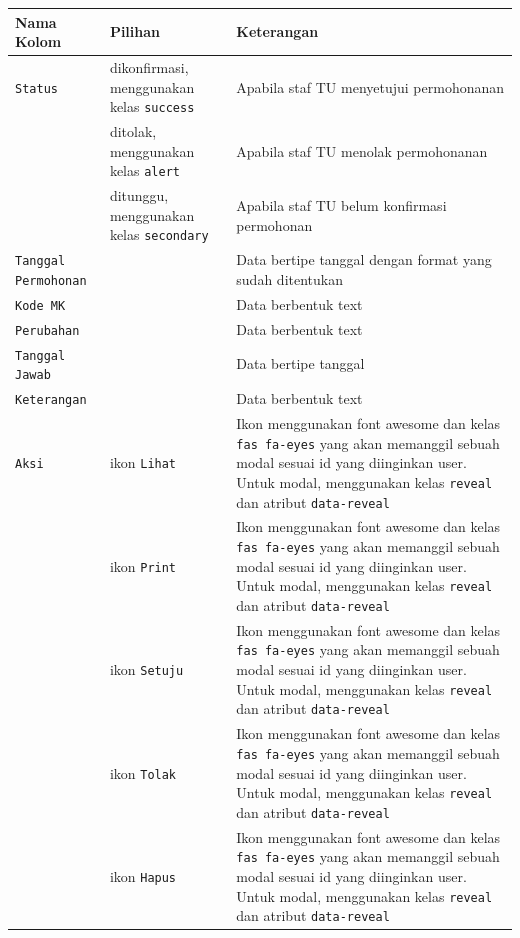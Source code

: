 \documentclass[a4paper,twoside]{article}
\begin{document}
\begin{enumerate}
		\begin{tabular}{|p{4cm}|p{2cm}|p{10cm}|}
			\hline
			Nama Kolom & Pilihan & Keterangan\\
			\hline
			\texttt{Status} & dikonfirmasi, menggunakan kelas \verb|success| & Apabila staf TU menyetujui permohonanan\\
			\hline
			&  ditolak, menggunakan kelas \verb|alert|  & Apabila staf TU menolak permohonanan\\
			\hline
			& ditunggu, menggunakan kelas \verb|secondary| &  Apabila staf TU belum konfirmasi permohonan \\
			\hline
			\texttt{Tanggal Permohonan}    & & Data bertipe tanggal dengan format yang sudah ditentukan\\
			\hline
			\texttt{Kode MK} &  & Data berbentuk text \\
			\hline
			\texttt{Perubahan} &  & Data berbentuk text \\
			\hline
			\texttt{Tanggal Jawab} &  & Data bertipe tanggal \\
			\hline
			\texttt{Keterangan} &  & Data berbentuk text \\
			\hline
			\texttt{Aksi} & ikon \texttt{Lihat} & Ikon menggunakan font awesome dan kelas \verb|fas fa-eyes| yang akan memanggil sebuah modal sesuai id yang diinginkan user. Untuk modal, menggunakan kelas \texttt{reveal} dan atribut \texttt{data-reveal}\\
			\hline
			& ikon \texttt{Print} & Ikon menggunakan font awesome dan kelas \verb|fas fa-eyes| yang akan memanggil sebuah modal sesuai id yang diinginkan user. Untuk modal, menggunakan kelas \texttt{reveal} dan atribut \texttt{data-reveal}\\
			\hline
			& ikon \texttt{Setuju} & Ikon menggunakan font awesome dan kelas \verb|fas fa-eyes| yang akan memanggil sebuah modal sesuai id yang diinginkan user. Untuk modal, menggunakan kelas \texttt{reveal} dan atribut \texttt{data-reveal}\\
			\hline
			& ikon \texttt{Tolak} & Ikon menggunakan font awesome dan kelas \verb|fas fa-eyes| yang akan memanggil sebuah modal sesuai id yang diinginkan user. Untuk modal, menggunakan kelas \texttt{reveal} dan atribut \texttt{data-reveal}\\
			\hline
			& ikon \texttt{Hapus} & Ikon menggunakan font awesome dan kelas \verb|fas fa-eyes| yang akan memanggil sebuah modal sesuai id yang diinginkan user. Untuk modal, menggunakan kelas \texttt{reveal} dan atribut \texttt{data-reveal}\\	

\end{tabular}
\end{enumerate}
\end{document}

